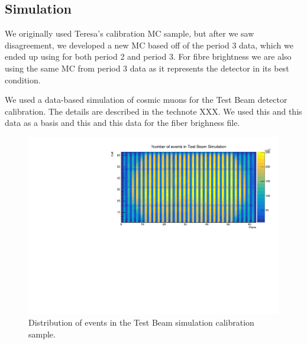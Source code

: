 \documentclass[12pt,a4paper]{article}
\begin{document}
\subsection{Simulation}

We originally used Teresa's calibration MC sample, but after we saw disagreement, we developed a new MC based off of the period 3 data, which we ended up using for both period 2 and period 3. For fibre brightness we are also using the same MC from period 3 data as it represents the detector in its best condition.

We used a data-based simulation of cosmic muons for the Test Beam detector calibration. The details are described in the technote XXX. We used this and this data as a basis and this and this data for the fiber brighness file.

\begin{figure}[!hbtp]
\centering
\includegraphics[width=\textwidth]{Plots/Attenprofs_Simulation_CellPlane.pdf}
\caption{Distribution of events in the Test Beam simulation calibration sample.}
\end{figure}
\end{document}
